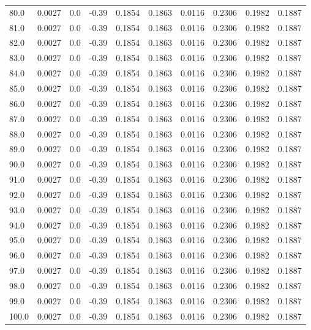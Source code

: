 \begin{longtable}{lrrrrrrrrr}
80.0 & 0.0027 & 0.0 & -0.39 & 0.1854 & 0.1863 & 0.0116 & 0.2306 & 0.1982 & 0.1887 \\
81.0 & 0.0027 & 0.0 & -0.39 & 0.1854 & 0.1863 & 0.0116 & 0.2306 & 0.1982 & 0.1887 \\
82.0 & 0.0027 & 0.0 & -0.39 & 0.1854 & 0.1863 & 0.0116 & 0.2306 & 0.1982 & 0.1887 \\
83.0 & 0.0027 & 0.0 & -0.39 & 0.1854 & 0.1863 & 0.0116 & 0.2306 & 0.1982 & 0.1887 \\
84.0 & 0.0027 & 0.0 & -0.39 & 0.1854 & 0.1863 & 0.0116 & 0.2306 & 0.1982 & 0.1887 \\
85.0 & 0.0027 & 0.0 & -0.39 & 0.1854 & 0.1863 & 0.0116 & 0.2306 & 0.1982 & 0.1887 \\
86.0 & 0.0027 & 0.0 & -0.39 & 0.1854 & 0.1863 & 0.0116 & 0.2306 & 0.1982 & 0.1887 \\
87.0 & 0.0027 & 0.0 & -0.39 & 0.1854 & 0.1863 & 0.0116 & 0.2306 & 0.1982 & 0.1887 \\
88.0 & 0.0027 & 0.0 & -0.39 & 0.1854 & 0.1863 & 0.0116 & 0.2306 & 0.1982 & 0.1887 \\
89.0 & 0.0027 & 0.0 & -0.39 & 0.1854 & 0.1863 & 0.0116 & 0.2306 & 0.1982 & 0.1887 \\
90.0 & 0.0027 & 0.0 & -0.39 & 0.1854 & 0.1863 & 0.0116 & 0.2306 & 0.1982 & 0.1887 \\
91.0 & 0.0027 & 0.0 & -0.39 & 0.1854 & 0.1863 & 0.0116 & 0.2306 & 0.1982 & 0.1887 \\
92.0 & 0.0027 & 0.0 & -0.39 & 0.1854 & 0.1863 & 0.0116 & 0.2306 & 0.1982 & 0.1887 \\
93.0 & 0.0027 & 0.0 & -0.39 & 0.1854 & 0.1863 & 0.0116 & 0.2306 & 0.1982 & 0.1887 \\
94.0 & 0.0027 & 0.0 & -0.39 & 0.1854 & 0.1863 & 0.0116 & 0.2306 & 0.1982 & 0.1887 \\
95.0 & 0.0027 & 0.0 & -0.39 & 0.1854 & 0.1863 & 0.0116 & 0.2306 & 0.1982 & 0.1887 \\
96.0 & 0.0027 & 0.0 & -0.39 & 0.1854 & 0.1863 & 0.0116 & 0.2306 & 0.1982 & 0.1887 \\
97.0 & 0.0027 & 0.0 & -0.39 & 0.1854 & 0.1863 & 0.0116 & 0.2306 & 0.1982 & 0.1887 \\
98.0 & 0.0027 & 0.0 & -0.39 & 0.1854 & 0.1863 & 0.0116 & 0.2306 & 0.1982 & 0.1887 \\
99.0 & 0.0027 & 0.0 & -0.39 & 0.1854 & 0.1863 & 0.0116 & 0.2306 & 0.1982 & 0.1887 \\
100.0 & 0.0027 & 0.0 & -0.39 & 0.1854 & 0.1863 & 0.0116 & 0.2306 & 0.1982 & 0.1887 \\

\end{longtable}

